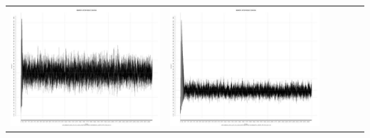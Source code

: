 \begin{table}[htbp]
{\begin{tabular}{l | ccccc}
\begin{minipage}{.15\textwidth}
     			 	\includegraphics[width=\linewidth]{images/mema-graph/I9}
    				 \end{minipage}
    			   &	 \begin{minipage}{.15\textwidth}
     			 	\includegraphics[width=\linewidth]{images/mema-graph/I12}
    				 \end{minipage}
    			   &	 \begin{minipage}{.15\textwidth}

\end{minipage}
\end{tabular}}
\end{table}
